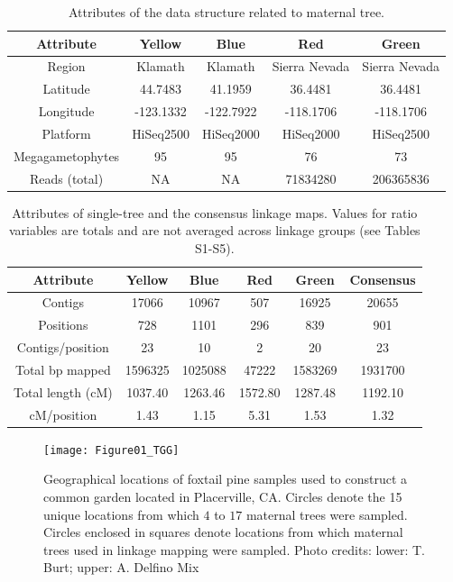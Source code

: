 \documentclass[smallextended]{svjour3}
\begin{document}
\begin{table}[ht]
\centering
\caption{Attributes of the data structure related to maternal tree.} 
\begin{tabular}{ccccc}
\toprule
Attribute & Yellow & Blue & Red & Green\\
\midrule
Region & Klamath & Klamath & Sierra Nevada & Sierra Nevada \\
Latitude & 44.7483 & 41.1959 & 36.4481 & 36.4481 \\
Longitude & -123.1332 & -122.7922 & -118.1706 & -118.1706 \\
Platform & HiSeq2500 & HiSeq2000 & HiSeq2000 & HiSeq2500 \\
Megagametophytes & 95 & 95 & 76 & 73 \\
Reads (total) & NA & NA & 71834280 & 206365836 \\
\bottomrule
\end{tabular}
\label{t:label}
\end{table}

\clearpage

\begin{table}[ht]
\centering
\caption{Attributes of single-tree and the consensus linkage maps. Values for ratio variables are totals and are not averaged 
  across linkage groups (see Tables S1-S5).} 

\begin{tabular}{cccccc}
\toprule
Attribute & Yellow & Blue & Red & Green & Consensus \\
\midrule
Contigs & 17066 & 10967 & 507 & 16925 & 20655 \\
Positions & 728 & 1101 & 296 & 839 & 901 \\
Contigs/position & 23 & 10 & 2 & 20 & 23 \\
Total bp mapped & 1596325 & 1025088 & 47222 & 1583269 & 1931700 \\
Total length (cM) & 1037.40 & 1263.46 & 1572.80 & 1287.48 & 1192.10 \\
cM/position & 1.43 & 1.15 & 5.31 & 1.53 & 1.32 \\
\bottomrule
\end{tabular}
\label{t:label}
\end{table}

\clearpage

\begin{figure}[ht]
\centering
\texttt{[image: Figure01\_TGG]}
\caption{Geographical locations of foxtail pine samples used to construct a
  common garden located in Placerville, CA. Circles denote the 15 unique
  locations from which $4$ to $17$ maternal trees were sampled. Circles enclosed
  in squares denote locations from which maternal trees used in linkage mapping
  were sampled. Photo credits: lower: T. Burt; upper: A. Delfino Mix}
\label{f:Figure01_TGG}
\end{figure}
\end{document}
